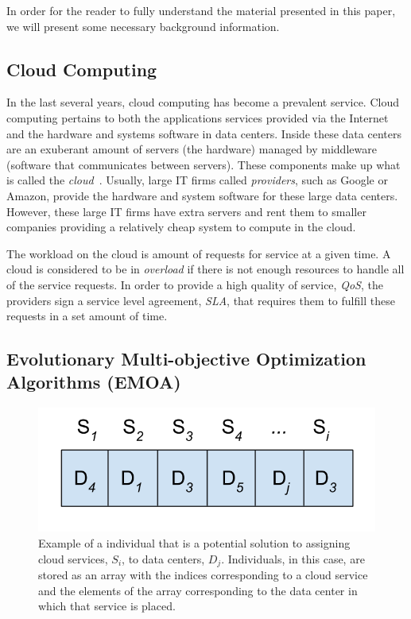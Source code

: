 \documentclass{sig-alternate}
\begin{document}
In order for the reader to fully understand the material presented in this paper, we will present some necessary background information.

\subsection{Cloud Computing}
\label{sec:Cloud Computing}

In the last several years, cloud computing has become a prevalent service. Cloud computing pertains to both the applications services provided via the Internet and the hardware and systems software in data centers. Inside these data centers are an exuberant amount of servers (the hardware) managed by middleware (software that communicates between servers). These components make up what is called the \emph{cloud}~\cite{Armbrust}. Usually, large IT firms called \emph{providers}, such as Google or Amazon, provide the hardware and system software for these large data centers. However, these large IT firms have extra servers and rent them to smaller companies providing a relatively cheap system to compute in the cloud. 

The workload on the cloud is amount of requests for service at a given time. A cloud is considered to be in \emph{overload} if there is not enough resources to handle all of the service requests. In order to provide a high quality of service, \emph{QoS}, the providers sign a service level agreement, \emph{SLA}, that requires them to fulfill these requests in a set amount of time. 

\subsection{Evolutionary Multi-objective Optimization Algorithms (EMOA)}
\label{sec:EMOA}

\begin{figure}[tb]
 \centering
 \includegraphics[height=0.15 \textwidth]{Individual}
 \caption{Example of a individual that is a potential solution to assigning cloud services, $S_i$, to data centers, $D_j$. Individuals, in this case, are stored as an array with the indices corresponding to a cloud service and the elements of the array corresponding to the data center in which that service is placed.}
 \label{fig:EMOA}
\end{figure}
\end{document}
